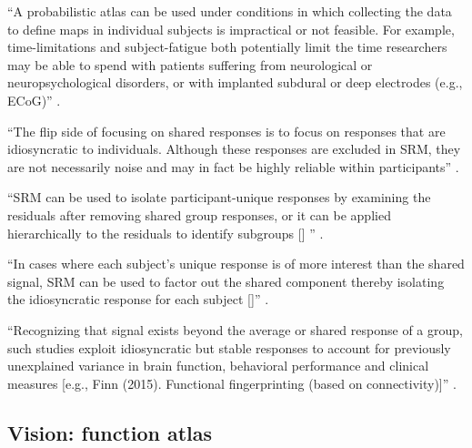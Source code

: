 ``A probabilistic atlas can be used under conditions in which collecting
the data to define maps in individual subjects is impractical or not feasible.
%
For example, time-limitations and subject-fatigue both potentially limit the
time researchers may be able to spend with patients suffering from
neurological or neuropsychological disorders, or with implanted subdural or deep
electrodes (e.g., ECoG)'' \citep{wang2015probabilistic}.





``The flip side of focusing on shared responses is to focus on responses that
are idiosyncratic to individuals.
%
Although these responses are excluded in SRM, they are not necessarily noise and
may in fact be highly reliable within participants''
\citep{cohen2017computational}.

``SRM can be used to isolate participant-unique responses by examining the
residuals after removing shared group responses, or it can be applied
hierarchically to the residuals to identify subgroups [\citet{chen2017shared}]
'' \citep{cohen2017computational}.

``In cases where each subject's unique response is of more interest
than the shared signal, SRM can be used to factor out the shared component
thereby isolating the idiosyncratic response for each subject
[\citep{chen2015reduced}]'' \citep{kumar2020brainiak}.

``Recognizing that signal exists beyond the average or shared response of a
group, such studies exploit idiosyncratic but stable responses to account for
previously unexplained variance in brain function, behavioral performance and
clinical measures [e.g., Finn (2015). Functional fingerprinting (based on
connectivity)]'' \citep{cohen2017computational}.




\subsection{Vision: function atlas}


